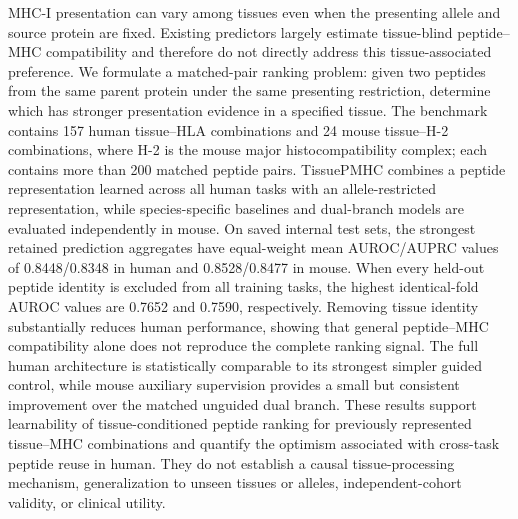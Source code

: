 MHC-I presentation can vary among tissues even when the presenting allele and source protein are fixed. Existing predictors largely estimate tissue-blind peptide--MHC compatibility and therefore do not directly address this tissue-associated preference. We formulate a matched-pair ranking problem: given two peptides from the same parent protein under the same presenting restriction, determine which has stronger presentation evidence in a specified tissue. The benchmark contains 157 human tissue--HLA combinations and 24 mouse tissue--H-2 combinations, where H-2 is the mouse major histocompatibility complex; each contains more than 200 matched peptide pairs. TissuePMHC combines a peptide representation learned across all human tasks with an allele-restricted representation, while species-specific baselines and dual-branch models are evaluated independently in mouse. On saved internal test sets, the strongest retained prediction aggregates have equal-weight mean AUROC/AUPRC values of 0.8448/0.8348 in human and 0.8528/0.8477 in mouse. When every held-out peptide identity is excluded from all training tasks, the highest identical-fold AUROC values are 0.7652 and 0.7590, respectively. Removing tissue identity substantially reduces human performance, showing that general peptide--MHC compatibility alone does not reproduce the complete ranking signal. The full human architecture is statistically comparable to its strongest simpler guided control, while mouse auxiliary supervision provides a small but consistent improvement over the matched unguided dual branch. These results support learnability of tissue-conditioned peptide ranking for previously represented tissue--MHC combinations and quantify the optimism associated with cross-task peptide reuse in human. They do not establish a causal tissue-processing mechanism, generalization to unseen tissues or alleles, independent-cohort validity, or clinical utility.
